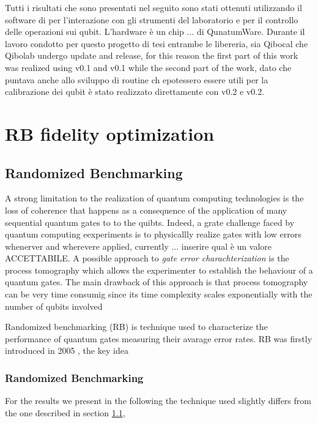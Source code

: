 Tutti i risultati che sono presentati nel seguito sono stati ottenuti utilizzando il software di \Qibolab per l'interazione con gli strumenti del laboratorio e \Qibocal per il controllo delle operazioni sui qubit.
L'hardware è un chip ... di QunatumWare.
Durante il lavoro condotto per questo progetto di tesi entrambe le libereria, sia Qibocal che Qibolab undergo update and release, for this reason the first part of this work was realized using \Qibocal v0.1 and \Qibolab v0.1 while the second part of the work, 
dato che puntava anche allo sviluppo di routine ch epotessero essere utili per la calibrazione dei qubit è stato realizzato direttamente con \Qibocal v0.2 e \Qibolab v0.2. 

\section{RB fidelity optimization}

\subsection{Randomized Benchmarking}\label{RBsection}
A strong limitation to the realization of quantum computing technologies is the loss of coherence that happens as a consequence of the application of many sequential quantum gates to to the quibts.
Indeed, a grate challenge faced by quantum computing eexperiments is to physicallly realize gates with low errors whenerver and wherevere applied, currently ... inserire qual è un valore ACCETTABILE.
A possible approach to \textit{gate error charachterization} is the process tomography which allows the experimenter to establish the behaviour of a quantum gates. 
The main drawback of this approach is that process tomography can be very time consumig since its time complexity scales exponentially with the number of qubits involved \cite{QPTomography}

Randomized benchmarking (RB) is technique used to characterize the performance of quantum gates measuring their avarage error rates.
RB was firstly introduced in 2005 \cite{Emerson_2005_RB}, the key idea 


\subsubsection{Randomized Benchmarking}
For the results we present in the following the technique used slightly differs from the one described in section \ref{RBsection}, %

